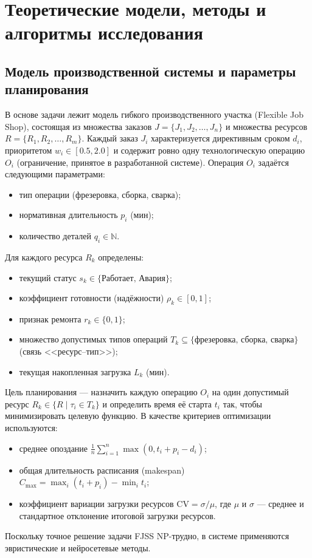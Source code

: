 \section{Теоретические модели, методы и алгоритмы исследования}

\subsection{Модель производственной системы и параметры планирования}

В основе задачи лежит модель гибкого производственного участка (Flexible Job Shop), состоящая из множества заказов $J = \{J_1, J_2, \dots, J_n\}$ и множества ресурсов $R = \{R_1, R_2, \dots, R_m\}$. Каждый заказ $J_i$ характеризуется директивным сроком $d_i$, приоритетом $w_i \in [0.5, 2.0]$ и содержит ровно одну технологическую операцию $O_i$ (ограничение, принятое в разработанной системе). Операция $O_i$ задаётся следующими параметрами:
\begin{itemize}
    \item тип операции (фрезеровка, сборка, сварка);
    \item нормативная длительность $p_i$ (мин);
    \item количество деталей $q_i \in \mathbb{N}$.
\end{itemize}
Для каждого ресурса $R_k$ определены:
\begin{itemize}
    \item текущий статус $s_k \in \{\text{Работает, Авария}\}$;
    \item коэффициент готовности (надёжности) $\rho_k \in [0, 1]$;
    \item признак ремонта $r_k \in \{0, 1\}$;
    \item множество допустимых типов операций $T_k \subseteq \{\text{фрезеровка, сборка, сварка}\}$ (связь <<ресурс–тип>>);
    \item текущая накопленная загрузка $L_k$ (мин).
\end{itemize}

Цель планирования — назначить каждую операцию $O_i$ на один допустимый ресурс $R_k \in \{R \mid \tau_i \in T_k\}$ и определить время её старта $t_i$ так, чтобы минимизировать целевую функцию. В качестве критериев оптимизации используются:
\begin{itemize}
    \item среднее опоздание $\frac{1}{n}\sum_{i=1}^n \max(0, t_i + p_i - d_i)$;
    \item общая длительность расписания (makespan) $C_{\max} = \max_i (t_i + p_i) - \min_i t_i$;
    \item коэффициент вариации загрузки ресурсов $\text{CV} = \sigma / \mu$, где $\mu$ и $\sigma$ — среднее и стандартное отклонение итоговой загрузки ресурсов.
\end{itemize}
Поскольку точное решение задачи FJSS NP-трудно, в системе применяются эвристические и нейросетевые методы.

